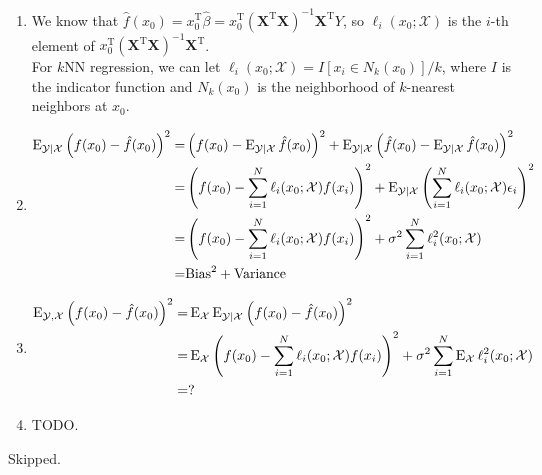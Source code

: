 \begin{sol}
\begin{enumerate}[label={(\alph*)}]
\item 
We know that $\hat{f}(x_0)=x_0^\mathrm{T}\hat{\beta}=x_0^\mathrm{T}(\mathbf{X}^\mathrm{T}\mathbf{X})^{-1}\mathbf{X}^\mathrm{T}Y$, so $\ell_i(x_0;\mathcal{X})$ is the $i$-th element of $x_0^\mathrm{T}(\mathbf{X}^\mathrm{T}\mathbf{X})^{-1}\mathbf{X}^\mathrm{T}$.\\
For $k$NN regression, we can let $\ell_i(x_0;\mathcal{X})=I[x_i\in N_k(x_0)]/k$, where $I$ is the indicator function and $N_k(x_0)$ is the neighborhood of $k$-nearest neighbors at $x_0$.

\item
\begin{align*}
\operatorname{E}_{\mathcal{Y}\vert\mathcal{X}}\left(f(x_0)-\hat{f}(x_0)\right)^2 =& \left(f(x_0)-\operatorname{E}_{\mathcal{Y}\vert\mathcal{X}}\hat{f}(x_0)\right)^2+\operatorname{E}_{\mathcal{Y}\vert\mathcal{X}}\left(\hat{f}(x_0)-\operatorname{E}_{\mathcal{Y}\vert\mathcal{X}}\hat{f}(x_0)\right)^2 \\
=& \left(f(x_0)-\sum_{i=1}^N\ell_i(x_0;\mathcal{X})f(x_i)\right)^2 + \operatorname{E}_{\mathcal{Y}\vert\mathcal{X}}\left(\sum_{i=1}^N\ell_i(x_0;\mathcal{X})\epsilon_i\right)^2 \\
=& \left(f(x_0)-\sum_{i=1}^N\ell_i(x_0;\mathcal{X})f(x_i)\right)^2 + \sigma^2\sum_{i=1}^N\ell_i^2(x_0;\mathcal{X})\\
=& \mathrm{Bias}^2+\mathrm{Variance}
\end{align*}

\item
\begin{align*}
\operatorname{E}_{\mathcal{Y},\mathcal{X}}\left(f(x_0)-\hat{f}(x_0)\right)^2 =& \operatorname{E}_{\mathcal{X}}\operatorname{E}_{\mathcal{Y}\vert\mathcal{X}}\left(f(x_0)-\hat{f}(x_0)\right)^2 \\
=& \operatorname{E}_{\mathcal{X}}\left(f(x_0)-\sum_{i=1}^N\ell_i(x_0;\mathcal{X})f(x_i)\right)^2 + \sigma^2 \sum_{i=1}^N\operatorname{E}_{\mathcal{X}}\ell_i^2(x_0;\mathcal{X}) \\
=& ?
\end{align*}
\item TODO.
\end{enumerate}
\end{sol}

\begin{sol}
Skipped.
\end{sol}


